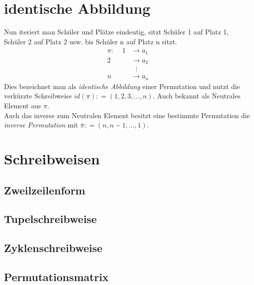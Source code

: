\documentclass{scrreprt}
\theoremstyle{remark}
\begin{document}
\section{identische Abbildung}
Nun iteriert man Schüler und Plätze eindeutig, sitzt Schüler 1 auf Platz 1, Schüler 2 auf Platz 2 usw. bis Schüler n auf Platz n sitzt.
\begin{align}
\pi\colon \,\,\,\,\,\,\, 1&\rightarrow a_{1} \nonumber \\ 
2&\rightarrow a_{2} \nonumber \\
&\,\,\,\,\vdots \nonumber \\
n&\rightarrow a_{n} \nonumber
\end{align}
Dies bezeichnet man als \textit{identische Abbildung} einer Permutation und nutzt die verkürzte Schreibweise $id(\pi) \colon = (1,2,3,\ldots,n)$. Auch bekannt als Neutrales Element aus $\pi$.\\
Auch das inverse zum Neutralen Element besitzt eine bestimmte Permutation die \textit{inverse Permutation} mit $\bar\pi\colon=(n,n-1,\ldots,1)$.
\section{Schreibweisen}
\subsection{Zweilzeilenform}
\subsection{Tupelschreibweise}
\subsection{Zyklenschreibweise}
\subsection{Permutationsmatrix}
\end{document}
